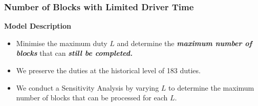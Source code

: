 \documentclass[handout]{beamer}
\begin{document}
\begin{frame}
	\frametitle{Number of Blocks with Limited Driver Time}
	\vspace{\baselineskip}
	
			    \textbf{Model Description}
			\begin{itemize}
                \item \small{Minimise the maximum duty $L$ and determine the \textbf{\textit{maximum number of blocks}} that can \textbf{\textit{still be completed.}}}
				\item We preserve the duties at the historical level of 183 duties.
				\item We conduct a Sensitivity Analysis by varying $L$ to determine the maximum number of blocks that can be processed for each $L$.
			\end{itemize}	
	
\vspace{\baselineskip}
			\centering
		    
		    \vspace{\baselineskip}


\end{frame}

\end{document}
